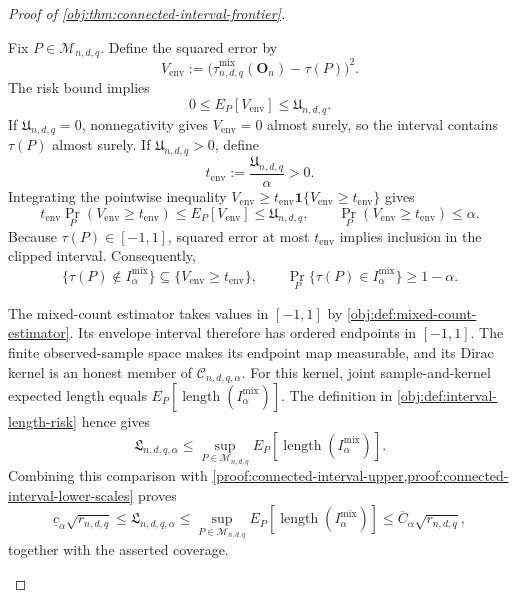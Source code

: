 \begin{proof}[Proof of \cref{obj:thm:connected-interval-frontier}]
\begin{enumerate}
Fix \(P\in\mathcal M_{n,d,q}\). Define the squared error by
\[
V_{\mathrm{env}}
:=
\bigl(\widehat\tau^{\mathrm{mix}}_{n,d,q}(\mathbf O_n)-\tau(P)\bigr)^2.
\]
The risk bound implies
\[
0\le E_P[V_{\mathrm{env}}]\le\mathfrak U_{n,d,q}.
\]
If \(\mathfrak U_{n,d,q}=0\), nonnegativity gives
\(V_{\mathrm{env}}=0\) almost surely, so the interval contains
\(\tau(P)\) almost surely. If \(\mathfrak U_{n,d,q}>0\), define
\[
t_{\mathrm{env}}:=\frac{\mathfrak U_{n,d,q}}{\alpha}>0.
\]
Integrating the pointwise inequality
\(V_{\mathrm{env}}\ge
t_{\mathrm{env}}\mathbf1\{V_{\mathrm{env}}\ge t_{\mathrm{env}}\}\)
gives
\[
t_{\mathrm{env}}\Pr_P(V_{\mathrm{env}}\ge t_{\mathrm{env}})
\le E_P[V_{\mathrm{env}}]\le\mathfrak U_{n,d,q},
\qquad
\Pr_P(V_{\mathrm{env}}\ge t_{\mathrm{env}})\le\alpha.
\]
Because \(\tau(P)\in[-1,1]\), squared error at most
\(t_{\mathrm{env}}\) implies inclusion in the clipped interval.
Consequently,
\[
\{\tau(P)\notin I^{\mathrm{mix}}_\alpha\}
\subseteq\{V_{\mathrm{env}}\ge t_{\mathrm{env}}\},
\qquad
\Pr_P\{\tau(P)\in I^{\mathrm{mix}}_\alpha\}\ge1-\alpha.
\]

The mixed-count estimator takes values in \([-1,1]\) by
\cref{obj:def:mixed-count-estimator}. Its envelope interval therefore
has ordered endpoints in \([-1,1]\). The finite observed-sample space
makes its endpoint map measurable, and its Dirac kernel is an honest
member of \(\mathcal C_{n,d,q,\alpha}\). For this kernel, joint
sample-and-kernel expected length equals
\(E_P[\operatorname{length}(I^{\mathrm{mix}}_\alpha)]\).
The definition in \cref{obj:def:interval-length-risk} hence gives
\[
\mathfrak L_{n,d,q,\alpha}
\le
\sup_{P\in\mathcal M_{n,d,q}}
E_P[\operatorname{length}(I^{\mathrm{mix}}_\alpha)].
\]
Combining this comparison with \cref{proof:connected-interval-upper,proof:connected-interval-lower-scales} proves
\[
\underline c_\alpha\sqrt{r_{n,d,q}}
\le\mathfrak L_{n,d,q,\alpha}
\le
\sup_{P\in\mathcal M_{n,d,q}}
E_P[\operatorname{length}(I^{\mathrm{mix}}_\alpha)]
\le\overline C_\alpha\sqrt{r_{n,d,q}},
\]
together with the asserted coverage.
\end{enumerate}
\end{proof}

